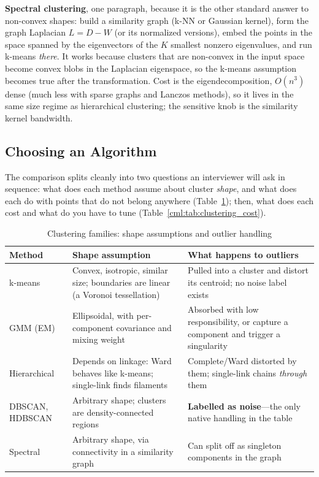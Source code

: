 \textbf{Spectral clustering}, one paragraph, because it is the other standard answer to non-convex shapes: build a similarity graph (k-NN or Gaussian kernel), form the graph Laplacian $L = D - W$ (or its normalized versions), embed the points in the space spanned by the eigenvectors of the $K$ smallest nonzero eigenvalues, and run k-means \emph{there}. It works because clusters that are non-convex in the input space become convex blobs in the Laplacian eigenspace, so the k-means assumption becomes true after the transformation. Cost is the eigendecomposition, $O(n^3)$ dense (much less with sparse graphs and Lanczos methods), so it lives in the same size regime as hierarchical clustering; the sensitive knob is the similarity kernel bandwidth.

\subsection{Choosing an Algorithm}

The comparison splits cleanly into two questions an interviewer will ask in sequence: what does each method assume about cluster \emph{shape}, and what does each do with points that do not belong anywhere (Table~\ref{cml:tab:clustering_compare}); then, what does each cost and what do you have to tune (Table~\ref{cml:tab:clustering_cost}).

\begin{table}[H]
\centering
\small
\caption{Clustering families: shape assumptions and outlier handling}
\label{cml:tab:clustering_compare}
\begin{tabularx}{\textwidth}{@{}l X X@{}}
\toprule
\textbf{Method} & \textbf{Shape assumption} & \textbf{What happens to outliers} \\
\midrule
k-means & Convex, isotropic, similar size; boundaries are linear (a Voronoi tessellation) & Pulled into a cluster and distort its centroid; no noise label exists \\
GMM (EM) & Ellipsoidal, with per-component covariance and mixing weight & Absorbed with low responsibility, or capture a component and trigger a singularity \\
Hierarchical & Depends on linkage: Ward behaves like k-means; single-link finds filaments & Complete/Ward distorted by them; single-link chains \emph{through} them \\
DBSCAN, HDBSCAN & Arbitrary shape; clusters are density-connected regions & \textbf{Labelled as noise}---the only native handling in the table \\
Spectral & Arbitrary shape, via connectivity in a similarity graph & Can split off as singleton components in the graph \\
\bottomrule
\end{tabularx}
\end{table}

